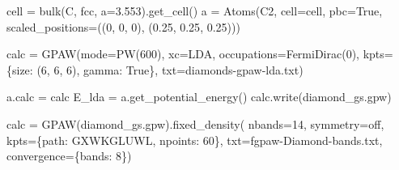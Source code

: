 \documentclass[
  letterpaper,
  DIV=11,
  numbers=noendperiod]{scrreprt}
\newenvironment{Shaded}{\begin{snugshade}}{\end{snugshade}}
\newcommand{\DecValTok}[1]{\textcolor[rgb]{0.68,0.00,0.00}{#1}}
\newcommand{\FloatTok}[1]{\textcolor[rgb]{0.68,0.00,0.00}{#1}}
\newcommand{\NormalTok}[1]{\textcolor[rgb]{0.00,0.23,0.31}{#1}}
\newcommand{\OperatorTok}[1]{\textcolor[rgb]{0.37,0.37,0.37}{#1}}
\newcommand{\SpecialStringTok}[1]{\textcolor[rgb]{0.13,0.47,0.30}{#1}}
\newcommand{\StringTok}[1]{\textcolor[rgb]{0.13,0.47,0.30}{#1}}
\newcommand{\VariableTok}[1]{\textcolor[rgb]{0.07,0.07,0.07}{#1}}
\begin{document}
\begin{Shaded}
\begin{Highlighting}[]
\NormalTok{cell }\OperatorTok{=}\NormalTok{ bulk(}\StringTok{\textquotesingle{}C\textquotesingle{}}\NormalTok{, }\StringTok{\textquotesingle{}fcc\textquotesingle{}}\NormalTok{, a}\OperatorTok{=}\FloatTok{3.553}\NormalTok{).get\_cell()}
\NormalTok{a }\OperatorTok{=}\NormalTok{ Atoms(}\StringTok{\textquotesingle{}C2\textquotesingle{}}\NormalTok{, cell}\OperatorTok{=}\NormalTok{cell, pbc}\OperatorTok{=}\VariableTok{True}\NormalTok{,}
\NormalTok{          scaled\_positions}\OperatorTok{=}\NormalTok{((}\DecValTok{0}\NormalTok{, }\DecValTok{0}\NormalTok{, }\DecValTok{0}\NormalTok{), (}\FloatTok{0.25}\NormalTok{, }\FloatTok{0.25}\NormalTok{, }\FloatTok{0.25}\NormalTok{)))}

\NormalTok{calc }\OperatorTok{=}\NormalTok{ GPAW(mode}\OperatorTok{=}\NormalTok{PW(}\DecValTok{600}\NormalTok{),}
\NormalTok{            xc}\OperatorTok{=}\StringTok{\textquotesingle{}LDA\textquotesingle{}}\NormalTok{,}
\NormalTok{            occupations}\OperatorTok{=}\NormalTok{FermiDirac(}\DecValTok{0}\NormalTok{),}
\NormalTok{            kpts}\OperatorTok{=}\NormalTok{\{}\StringTok{\textquotesingle{}size\textquotesingle{}}\NormalTok{: (}\DecValTok{6}\NormalTok{, }\DecValTok{6}\NormalTok{, }\DecValTok{6}\NormalTok{), }\StringTok{\textquotesingle{}gamma\textquotesingle{}}\NormalTok{: }\VariableTok{True}\NormalTok{\},}
\NormalTok{            txt}\OperatorTok{=}\StringTok{\textquotesingle{}diamonds{-}gpaw{-}lda.txt\textquotesingle{}}\NormalTok{)}

\NormalTok{a.calc }\OperatorTok{=}\NormalTok{ calc}
\NormalTok{E\_lda }\OperatorTok{=}\NormalTok{ a.get\_potential\_energy()}
\NormalTok{calc.write(}\StringTok{\textquotesingle{}diamond\_gs.gpw\textquotesingle{}}\NormalTok{)}
\end{Highlighting}
\end{Shaded}

\begin{Shaded}
\begin{Highlighting}[]
\NormalTok{calc }\OperatorTok{=}\NormalTok{ GPAW(}\StringTok{\textquotesingle{}diamond\_gs.gpw\textquotesingle{}}\NormalTok{).fixed\_density(}
\NormalTok{    nbands}\OperatorTok{=}\DecValTok{14}\NormalTok{,}
\NormalTok{    symmetry}\OperatorTok{=}\StringTok{\textquotesingle{}off\textquotesingle{}}\NormalTok{,}
\NormalTok{    kpts}\OperatorTok{=}\NormalTok{\{}\StringTok{\textquotesingle{}path\textquotesingle{}}\NormalTok{: }\StringTok{\textquotesingle{}GXWKGLUWL\textquotesingle{}}\NormalTok{, }\StringTok{\textquotesingle{}npoints\textquotesingle{}}\NormalTok{: }\DecValTok{60}\NormalTok{\},}
\NormalTok{    txt}\OperatorTok{=}\SpecialStringTok{f\textquotesingle{}gpaw{-}Diamond{-}bands.txt\textquotesingle{}}\NormalTok{,}
\NormalTok{    convergence}\OperatorTok{=}\NormalTok{\{}\StringTok{\textquotesingle{}bands\textquotesingle{}}\NormalTok{: }\DecValTok{8}\NormalTok{\})}
\end{Highlighting}
\end{Shaded}
\end{document}
